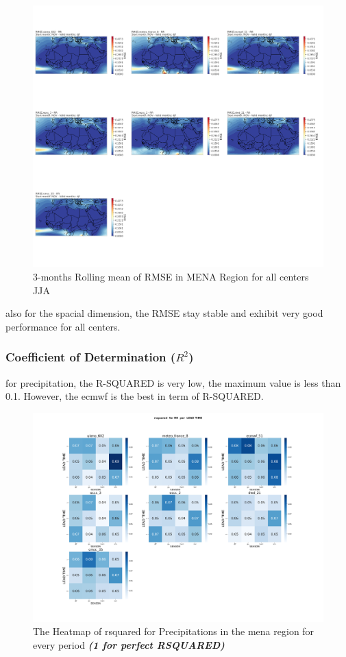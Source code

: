 \begin{figure}[H]
\includegraphics[scale=0.3]{plots/det/rmse/rmse_djf_RR.png}
\caption{3-months Rolling mean of RMSE in MENA Region for all centers JJA}
\end{figure}

also for the spacial dimension, the RMSE stay stable and exhibit very good performance for all centers. 


\subsubsection{Coefficient of Determination (\( R^2 \))}

for precipitation, the R-SQUARED is very low, the maximum value is less than 0.1. However, the ecmwf is the best in term of R-SQUARED.
\begin{figure}[H]
	\centering
	\includegraphics[scale=0.25]{plots/det/rsquared/rsquared_RR.png}
	\caption{The Heatmap of rsquared for Precipitations in the mena region for every period \textbf{\textit{(1 for perfect RSQUARED)} }}
\end{figure}



